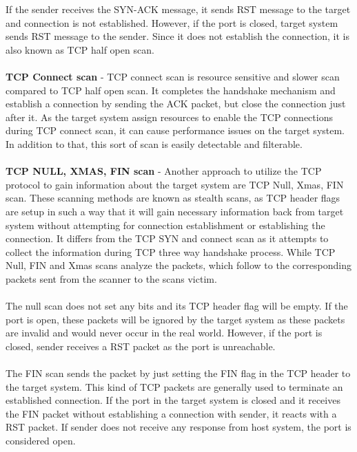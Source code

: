     If the sender receives the SYN-ACK message, it sends RST message to the target and connection is not established.
    However, if the port is closed, target system sends RST message to the sender.
    Since it does not establish the connection, it is also known as TCP half open scan.\\\\
    \textbf{TCP Connect scan} -  TCP  connect  scan  is resource sensitive and slower scan compared to TCP half open scan.  It completes the handshake mechanism and establish a connection by sending the ACK packet, but close the connection just after it.
    As the target system assign resources to enable the TCP connections during TCP connect scan, it can cause performance issues on the target system.
    In addition to that, this sort of scan is easily detectable and filterable.\\\\
    \textbf{TCP NULL, XMAS, FIN scan} - Another approach to utilize the TCP protocol to gain information about the target system are TCP Null, Xmas, FIN scan. 
    These scanning methods are known as stealth scans, as TCP header flags are setup in such a way that it will gain necessary information back from target system without attempting for connection establishment or establishing the connection.
    It differs from the TCP SYN and connect scan as it attempts to collect the information during  TCP three way handshake process.
    While TCP Null, FIN and Xmas scans analyze the packets, which
    follow to the corresponding packets sent from the scanner to the scans victim.\\\\
    The null scan does not set any bits and its TCP header flag will be empty.
    If the port is open, these packets will be ignored by the target system as these packets are invalid and would never occur in the real world.
    However, if the port is closed, sender receives a RST packet as the port is unreachable.\\\\
    The FIN scan sends the packet by just setting the FIN flag in the TCP header to the target system.
    This kind of TCP packets are generally used to terminate an established connection.
    If the port in the target system is closed and it receives the FIN packet without establishing a connection with sender, it reacts with a RST packet.
    If sender does not receive any response from host system, the port is considered open.\\\\
